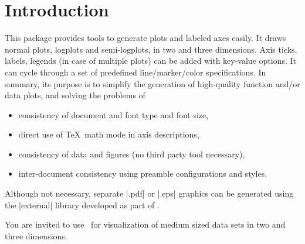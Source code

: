 \maketitle
\begin{abstract}%
\PGFPlots\ draws high--quality function plots in normal or logarithmic scaling with a user-friendly interface directly in \TeX. The user supplies axis labels, legend entries and the plot coordinates for one or more plots and \PGFPlots\ applies axis scaling, computes any logarithms and axis ticks and draws the plots. It supports line plots, scatter plots, piecewise constant plots, bar plots, area plots, mesh-- and surface plots, patch plots, contour plots, quiver plots, histogram plots, polar axes, ternary diagrams, smith charts and some more. It is based on Till Tantau's package \PGF/\Tikz.
\end{abstract}
\tableofcontents
\section{Introduction}
This package provides tools to generate plots and labeled axes easily. It draws normal plots, logplots and semi-logplots, in two and three dimensions. Axis ticks, labels, legends (in case of multiple plots) can be added with key-value options. It can cycle through a set of predefined line/marker/color specifications. In summary, its purpose is to simplify the generation of high-quality function and/or data plots, and solving the problems of
\begin{itemize}
	\item consistency of document and font type and font size,
	\item direct use of \TeX\ math mode in axis descriptions,
	\item consistency of data and figures (no third party tool necessary),
	\item inter-document consistency using preamble configurations and styles.
\end{itemize}
Although not necessary, separate |.pdf| or |.eps| graphics can be generated using the |external| library developed as part of \Tikz.

You are invited to use \PGFPlots\ for visualization of medium sized data sets in two and three dimensions.

